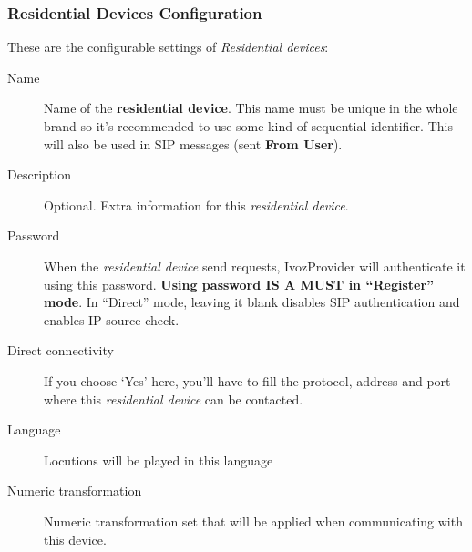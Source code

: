 \documentclass[letterpaper,10pt,english]{sphinxmanual}
\begin{document}
\subsubsection{Residential Devices Configuration}
\label{administration_portal/client/residential/residential_devices:residential-devices-configuration}
These are the configurable settings of \emph{Residential devices}:
\begin{description}
\item[{Name}] \leavevmode{}\label{administration_portal/client/residential/residential_devices:term-name}
Name of the \textbf{residential device}. This name must be unique in the whole brand so
it's recommended to use some kind of sequential identifier. This will also be used
in SIP messages (sent \textbf{From User}).

\item[{Description}] \leavevmode{}\label{administration_portal/client/residential/residential_devices:term-description}
Optional. Extra information for this \emph{residential device}.

\item[{Password}] \leavevmode{}\label{administration_portal/client/residential/residential_devices:term-password}
When the \emph{residential device} send requests, IvozProvider will authenticate it using
this password. \textbf{Using password IS A MUST in ``Register'' mode}. In ``Direct'' mode,
leaving it blank disables SIP authentication and enables IP source check.

\item[{Direct connectivity}] \leavevmode{}\label{administration_portal/client/residential/residential_devices:term-direct-connectivity}
If you choose `Yes' here, you'll have to fill the protocol, address and
port where this \emph{residential device} can be contacted.

\item[{Language}] \leavevmode{}\label{administration_portal/client/residential/residential_devices:term-language}
Locutions will be played in this language

\item[{Numeric transformation}] \leavevmode{}\label{administration_portal/client/residential/residential_devices:term-numeric-transformation}
Numeric transformation set that will be applied when communicating with this device.


\end{description}
\end{document}
